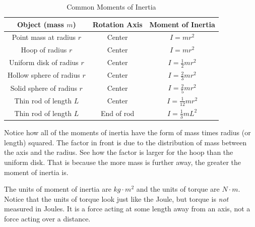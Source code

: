 \documentclass[12pt]{book}
\begin{document}
\begin{table}[H]
\large
\centering
\caption{Common Moments of Inertia}
\label{moi}
\begin{tabular}{| c | c | c |}
	\hline
	Object (mass $m$) & Rotation Axis & Moment of Inertia \\
	\hline
	Point mass at radius $r$ & Center & $I = mr^2$ \\[5pt]
	\hline
	Hoop of radius $r$ & Center & $I = mr^2$ \\[5pt]
	\hline
	Uniform disk of radius $r$ & Center & $I = \frac{1}{2}mr^2$ \\[5pt]
	\hline
	Hollow sphere of radius $r$ & Center & $I = \frac{2}{3}mr^2$ \\[5pt]
	\hline
	Solid sphere of radius $r$ & Center & $I = \frac{2}{5} m r^2$ \\[5pt]
	\hline 
	Thin rod of length $L$ & Center & $I = \frac{1}{12} mr^2$ \\[5pt]
	\hline
	Thin rod of length $L$ & End of rod & $I = \frac{1}{3} mL^2$ \\[5pt]
	\hline
\end{tabular}
\end{table}

Notice how all of the moments of inertia have the form of mass times radius (or length) squared. The factor in front is due to the distribution of mass between the axis and the radius. See how the factor is larger for the hoop than the uniform disk. That is because the more mass is further away, the greater the moment of inertia is. 

The units of moment of inertia are $kg \cdot m^2$ and the units of torque are $N \cdot m$. Notice that the units of torque look just like the Joule, but torque is \textit{not} measured in Joules. It is a force acting at some length away from an axis, not a force acting over a distance.
\end{document}
